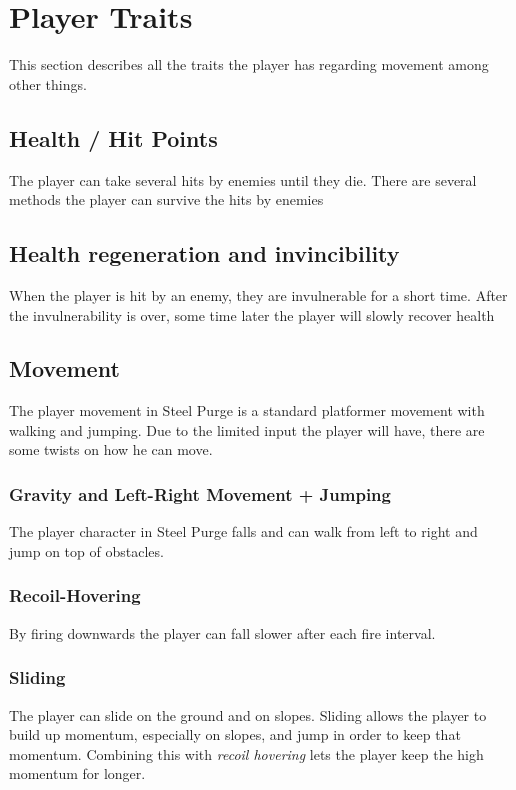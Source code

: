 \documentclass[../Main.tex]{subfiles}
\begin{document}
\section{Player Traits}

This section describes all the traits the player has regarding movement among other things.

\subsection{Health / Hit Points}

The player can take several hits by enemies until they die. There are several methods the player can survive the hits by enemies

\subsection{Health regeneration and invincibility}

When the player is hit by an enemy, they are invulnerable for a short time. After the invulnerability is over, some time later the player will slowly recover health

\subsection{Movement}

The player movement in Steel Purge is a standard platformer movement with walking and jumping. Due to the limited input the player will have, there are some twists on how he can move.

\subsubsection{Gravity and Left-Right Movement + Jumping}

The player character in Steel Purge falls and can walk from left to right and jump on top of obstacles.

\subsubsection{Recoil-Hovering}

By firing downwards the player can fall slower after each fire interval.

\subsubsection{Sliding}

The player can slide on the ground and on slopes. Sliding allows the player to build up momentum, especially on slopes, and jump in order to keep that momentum. Combining this with \emph{recoil hovering} lets the player keep the high momentum for longer.
\end{document}
